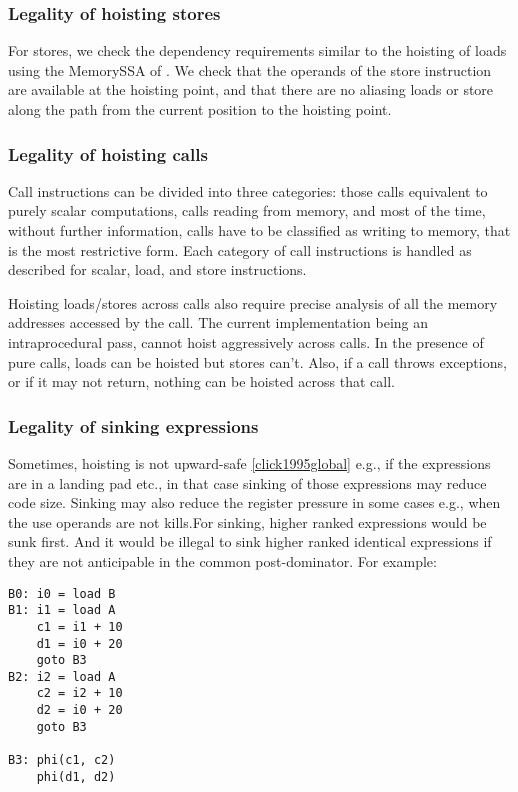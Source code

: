 \documentclass[acmlarge,review]{acmart}\settopmatter{printfolios=true}
\begin{document}
\subsubsection{Legality of hoisting stores}
For stores, we check the dependency requirements similar to the hoisting of
loads using the MemorySSA of \LLVM{}. We check that the operands of the store
instruction are available at the hoisting point, and that there are no aliasing
loads or store along the path from the current position to the hoisting point.

\subsubsection{Legality of hoisting calls}
Call instructions can be divided into three categories: those calls equivalent
to purely scalar computations, calls reading from memory, and most of the time,
without further information, calls have to be classified as writing to memory,
that is the most restrictive form.  Each category of call instructions is
handled as described for scalar, load, and store instructions.

Hoisting loads/stores across calls also require precise analysis of all the
memory addresses accessed by the call. The current implementation being an
intraprocedural pass, cannot hoist aggressively across calls. In the presence of
pure calls, loads can be hoisted but stores can't. Also, if a call throws
exceptions, or if it may not return, nothing can be hoisted across that call.

\subsubsection{Legality of sinking expressions}
Sometimes, hoisting is not upward-safe \ref{click1995global} e.g., if the
expressions are in a landing pad etc., in that case sinking of those expressions
may reduce code size. Sinking may also reduce the register pressure in some
cases e.g., when the use operands are not kills.For sinking, higher ranked
expressions would be sunk first. And it would be illegal to sink higher ranked
identical expressions if they are not anticipable in the common
post-dominator. For example:

\begin{verbatim}
B0: i0 = load B
B1: i1 = load A
    c1 = i1 + 10
    d1 = i0 + 20
    goto B3
B2: i2 = load A
    c2 = i2 + 10
    d2 = i0 + 20
    goto B3

B3: phi(c1, c2)
    phi(d1, d2)
\end{verbatim}
\end{document}
